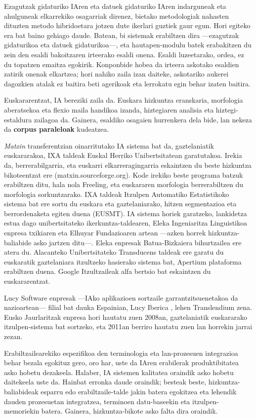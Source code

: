 \begin{multicols}{2}
Ezagutzak gidaturiko IAren eta datuek gidaturiko IAren indarguneak eta ahulguneak elkarrekiko osagarriak direnez, bietako metodologiak nahasten dituzten metodo hibridoetara jotzen dute ikerlari guztiek gaur egun. Hori egiteko era bat baino gehiago daude. Batean, bi sistemak erabiltzen dira —ezagutzak gidaturikoa eta datuek gidaturikoa—, eta hautapen-modulu batek erabakitzen du zein den esaldi bakoitzaren irteerako esaldi onena. Esaldi luzeetarako, ordea, ez du topatzen emaitza egokirik. Konponbide hobea da irteera askotako esaldien zatirik onenak elkartzea; hori nahiko zaila izan daiteke, askotariko aukerei dagozkien atalak ez baitira beti agerikoak eta lerrokatu egin behar izaten baitira. 

Euskararentzat, IA bereziki zaila da. Euskara hizkuntza eranskaria, morfologia aberatsekoa eta flexio maila handikoa izanda, hiztegiaren analisia eta hiztegi-estaldura zailagoa da. Gainera, esaldiko osagaien hurrenkera dela bide, lan nekeza da \textbf{corpus paraleloak} kudeatzea. 

\textit{Matxin} transferentzian oinarritutako IA sistema bat da, gaztelaniatik euskararakoa, IXA taldeak Euskal Herriko Unibertsitatean garatutakoa.  Irekia da, berrerabilgarria, eta euskarri elkarreragingarria eskaintzen du beste hizkuntza bikoteentzat ere (matxin.sourceforge.org). Kode irekiko beste programa batzuk erabiltzen ditu, hala nola Freeling, eta euskararen morfologia berrerabiltzen du morfologia sorkuntzarako. IXA taldeak Itzulpen Automatiko Estatistikoko sistema bat ere sortu du euskara eta gaztelaniarako, hitzen segmentazioa eta berrordenaketa egiten duena (EUSMT). IA sistema horiek garatzeko, lankidetza estua dago unibertsitateko ikerkuntza-taldearen, Eleka Ingeniaritza Linguistikoa enpresa txikiaren eta Elhuyar Fundazioaren artean —azken horrek hizkuntza-baliabide asko jartzen ditu—. Eleka enpresak Batua-Bizkaiera bihurtzailea ere atera du. Alacanteko Unibertsitateko Transducens taldeak ere garatu du euskaratik gaztelaniara itzultzeko hasierako sistema bat, Apertium plataforma erabiltzen duena. Google Itzultzaileak alfa bertsio bat eskaintzen du euskararentzat.

Lucy Software enpresak —IAko aplikazioen sortzaile garrantzitsuenetakoa da nazioartean— filial bat dauka Espainian, Lucy Iberica \cite{BAS-Nota35}, lehen Trans\-len\-dium zena. Eusko Jaurlaritzak enpresa hori hautatu zuen 2008an, gaztelaniatik euskararako itzulpen-sistema bat sortzeko, eta 2011an berriro hautatu zuen lan horrekin jarrai zezan. 

Erabiltzailearekiko espezifikoa den terminologia eta lan-prozesuen integrazioa behar bezala egokituz gero, oro har, uste da IAren erabilerak produktibitatea asko hobetu dezakeela. Halaber, IA sistemen kalitatea oraindik asko hobetu daitekeela uste da. Hainbat erronka daude oraindik; besteak beste, hizkuntza-baliabideak esparru edo erabiltzaile-talde jakin batera egokitzea eta lehendik dauden prozesuetan integratzea, terminoen datu-baseekin eta itzulpen-memoriekin batera. Gainera, hizkuntza-bikote asko falta dira oraindik.


\end{multicols}
